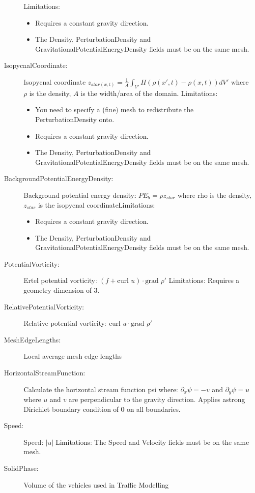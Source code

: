 \begin{description}
	Limitations: \begin{itemize}
	\item Requires a constant gravity direction. 
	\item The Density, PerturbationDensity and GravitationalPotentialEnergyDensity fields must be on the same mesh. 
	\end{itemize}
\item[IsopycnalCoordinate:]Isopycnal coordinate
	$z_{star(x,t)} = \frac{1}{A} \int_{V'} H(\rho(x',t)-\rho(x,t)) dV'$ where $\rho$ is the density, $A$ is the width/area of the domain.
	Limitations:
	\begin{itemize}
	\item You need to specify a (fine) mesh to redistribute the PerturbationDensity onto.
	\item Requires a constant gravity direction. 
	\item The Density, PerturbationDensity and GravitationalPotentialEnergyDensity fields must be on the same mesh. 
	\end{itemize} 
\item[BackgroundPotentialEnergyDensity:]Background potential energy density: $PE_b = \rho z_{star}$ where rho is the density, $z_{star}$ is the isopycnal coordinateLimitations: 
	\begin{itemize}
	\item Requires a constant gravity direction. 
	\item The Density, PerturbationDensity and GravitationalPotentialEnergyDensity fields must be on the same mesh. 
	\end{itemize}
\item[PotentialVorticity:]Ertel potential vorticity: $(f + \mbox{curl } u) \cdot \mbox{grad } \rho'$
	Limitations: Requires a geometry dimension of 3.  
\item[RelativePotentialVorticity:]Relative potential vorticity:  $\mbox{curl } u \cdot \mbox{grad } \rho'$  
\item[MeshEdgeLengths:]Local average mesh edge lengths  
\item[HorizontalStreamFunction:]Calculate the horizontal stream function psi where:  $\partial_x \psi = -v$ and  $\partial_y \psi = u$ where $u$ and $v$ are perpendicular to the gravity direction. Applies astrong Dirichlet boundary condition of $0$ on all boundaries.  
\item[Speed:]Speed: $|u|$ 
	Limitations: The Speed and Velocity fields must be on the same mesh.  
\item[SolidPhase:]Volume of the vehicles used in Traffic Modelling  

\end{description}
